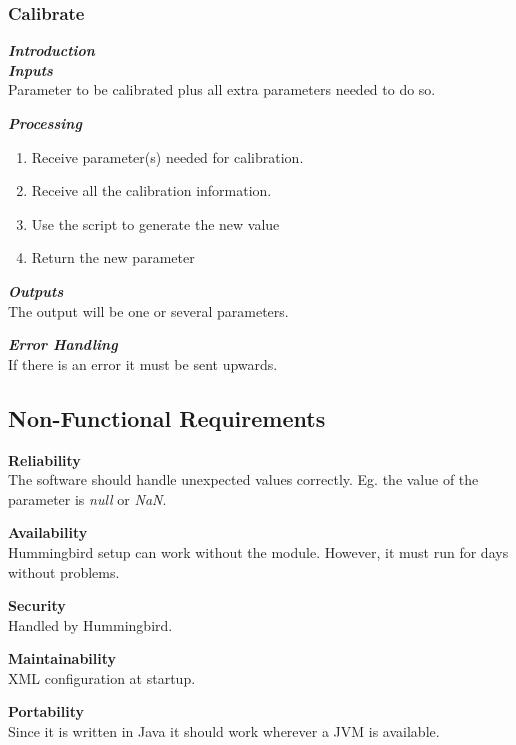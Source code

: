 \subsubsection{Calibrate}

\textbf{\emph{Introduction}}\\



\textbf{\emph{Inputs}}\\

Parameter to be calibrated plus all extra parameters needed to do so.

\textbf{\emph{Processing}}\\
\begin{enumerate}
\item Receive parameter(s) needed for calibration.
\item Receive all the calibration information.
\item Use the script to generate the new value
\item Return the new parameter
\end{enumerate}

\textbf{\emph{Outputs}}\\

The output will be one or several parameters.


\textbf{\emph{Error Handling}}\\
If there is an error it must be sent upwards.


\subsection{Non-Functional Requirements}

\textbf{Reliability}\\
The software should handle unexpected values correctly. Eg. the value of the parameter is \emph{null} or \emph{NaN}.

\textbf{Availability}\\
Hummingbird setup can work without the module. However, it must run for days without problems.

\textbf{Security}\\
Handled by Hummingbird.

\textbf{Maintainability}\\
XML configuration at startup.

\textbf{Portability}\\
Since it is written in Java it should work wherever a JVM is available.


